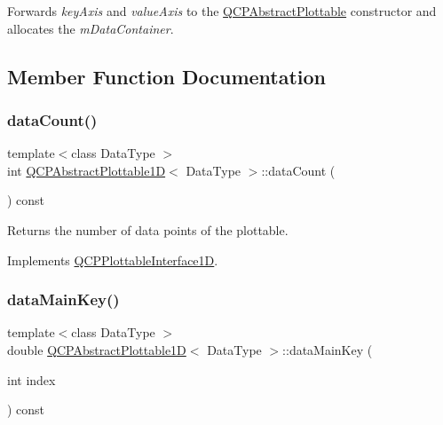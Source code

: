 Forwards {\itshape key\+Axis} and {\itshape value\+Axis} to the \hyperlink{class_q_c_p_abstract_plottable_af78a036e40db6f53a31abadc5323715a}{Q\+C\+P\+Abstract\+Plottable} constructor and allocates the {\itshape m\+Data\+Container}. 

\subsection{Member Function Documentation}
\mbox{\label{class_q_c_p_abstract_plottable1_d_a354545da303458283df3f7948a7a768b}} 
\subsubsection{\texorpdfstring{data\+Count()}{dataCount()}}
{\footnotesize\ttfamily template$<$class Data\+Type $>$ \\
int \hyperlink{class_q_c_p_abstract_plottable1_d}{Q\+C\+P\+Abstract\+Plottable1D}$<$ Data\+Type $>$\+::data\+Count (\begin{DoxyParamCaption}{ }\end{DoxyParamCaption}) const\hspace{0.3cm}{\ttfamily [virtual]}}





Returns the number of data points of the plottable. 

Implements \hyperlink{class_q_c_p_plottable_interface1_d_a058a22c770ef4d5a0e878a7f02183da9}{Q\+C\+P\+Plottable\+Interface1D}.

\mbox{\label{class_q_c_p_abstract_plottable1_d_ab14ab428595856bf76e04499017fa8dc}} 
\subsubsection{\texorpdfstring{data\+Main\+Key()}{dataMainKey()}}
{\footnotesize\ttfamily template$<$class Data\+Type $>$ \\
double \hyperlink{class_q_c_p_abstract_plottable1_d}{Q\+C\+P\+Abstract\+Plottable1D}$<$ Data\+Type $>$\+::data\+Main\+Key (\begin{DoxyParamCaption}\item[{int}]{index }\end{DoxyParamCaption}) const\hspace{0.3cm}{\ttfamily [virtual]}}





